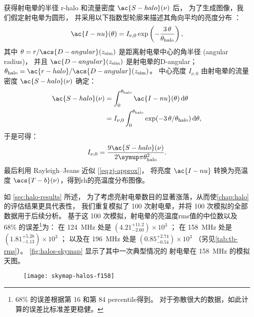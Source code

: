 获得射电晕的半径 \ac{r-halo} 和流量密度 $\ac{S-halo}(\nu)$ 后，
为了生成图像，我们假定射电晕为圆形，
并采用以下指数型轮廓来描述其角向平均的亮度分布 \cite{murgia2009}：
\begin{equation}
  \label{eq:halo-profile}
  \ac{I-nu}(\theta) =
    I_{\nu,0} \exp\left( -\frac{3\,\theta}{\theta_{\R{halo}}} \right) ,
\end{equation}
其中
$\theta = r / \acs{D-angular}(z_{\R{sim}})$ 是距离射电晕中心的角半径
(angular radius)，
并且 $\ac{D-angular}(z_{\R{sim}})$ 是射电晕的\acl{D-angular}；
$\theta_{\R{halo}} = \ac{r-halo} / \acs{D-angular}(z_{\R{sim}})$。
中心亮度 $I_{\nu,0}$ 由射电晕的流量密度 $\ac{S-halo}(\nu)$ 确定：
\begin{align}
  \ac{S-halo}(\nu)
    & = \int_0^{\theta_{\R{halo}}} \ac{I-nu}(\theta) \,\D{\theta} \\
    & = I_{\nu,0} \int_0^{\theta_{\R{halo}}}
        \exp( -3\,\theta / \theta_{\R{halo}} ) \,\D{\theta} ,
\end{align}
于是可得：
\begin{equation}
  I_{\nu,0} = \frac{9 \ac{S-halo}(\nu)}{2\Cpi \theta^2_{\R{halo}}} .
\end{equation}
最后利用 Rayleigh--Jeans 近似 [\autoref{eq:rj-approx}]，
将亮度 $\ac{I-nu}$ 转换为亮温度 $\acs{T-b}(\nu)$，得到\ac{rh}的亮温度分布图像。

如 \autoref{sec:halo-results} 所述，
为了考虑亮射电晕数目的显著涨落，从而使\autoref{chap:halo}的评估结果更具代表性，
我们重复模拟了 100 次射电晕，并将 100 次模拟的全部数据用于后续分析。
基于这 100 次模拟，射电晕的亮温度\ac{rms}值的中位数以及 68\% 的误差\footnote{%
  68\% 的误差根据第 16 和第 84 \ac{percentile}得到。
  对于弥散很大的数据，如此计算的误差比标准差更稳健。
}为：
在 \SI{124}{\MHz} 处是
$\left(4.21_{-2.60}^{+11.2}\right) \times 10^3$ \si{\mK}；
在 \SI{158}{\MHz} 处是
$\left(1.81_{-1.13}^{+5.28}\right) \times 10^3$ \si{\mK}；
以及在 \SI{196}{\MHz} 处是
$\left(0.85_{-0.54}^{+2.74}\right) \times 10^3$ \si{\mK}
（另见\autoref{tab:tb-rms}）。
\autoref{fig:halos-skymap} 显示了其中一次典型情况的
射电晕在 \SI{158}{\MHz} 的模拟天图。

\begin{figure}[htp]
  \centering
  \texttt{[image: skymap-halos-f158]}
  \label{fig:halos-skymap}
\end{figure}

